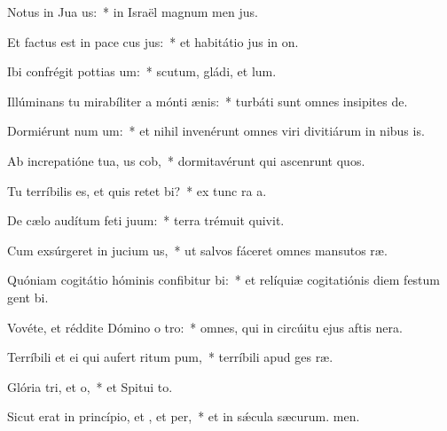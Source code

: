 \item Notus in Jua us:~* in Israël magnum men jus.
\item Et factus est in pace cus jus:~* et habitátio jus in on.
\item Ibi confrégit pottias um:~* scutum, gládi, et lum.
\item Illúminans tu mirabíliter a mónti ænis:~* turbáti sunt omnes insipites de.
\item Dormiérunt num um:~* et nihil invenérunt omnes viri divitiárum in nibus is.
\item Ab increpatióne tua, us cob,~* dormitavérunt qui ascenrunt quos.
\item Tu terríbilis es, et quis retet bi?~* ex tunc ra a.
\item De cælo audítum feti juum:~* terra trémuit  quivit.
\item Cum exsúrgeret in jucium us,~* ut salvos fáceret omnes mansutos ræ.
\item Quóniam cogitátio hóminis confibitur bi:~* et relíquiæ cogitatiónis diem festum gent bi.
\item Vovéte, et réddite Dómino o tro:~* omnes, qui in circúitu ejus aftis nera.
\item Terríbili et ei qui aufert ritum pum,~* terríbili apud ges ræ.
\item Glória tri, et o,~* et Spitui to.
\item Sicut erat in princípio, et , et per,~* et in sǽcula sæcurum. men.
